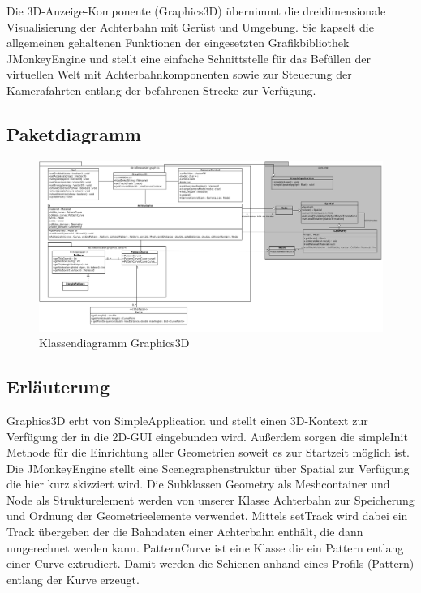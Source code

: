 Die 3D-Anzeige-Komponente (Graphics3D) übernimmt die dreidimensionale Visualisierung der Achterbahn
mit Gerüst und Umgebung. Sie kapselt die allgemeinen gehaltenen Funktionen der eingesetzten
Grafikbibliothek JMonkeyEngine und stellt eine einfache Schnittstelle für das Befüllen 
der virtuellen Welt mit Achterbahnkomponenten sowie zur Steuerung der Kamerafahrten 
entlang der befahrenen Strecke zur Verfügung.

\subsection{Paketdiagramm}

\begin{figure}
\includegraphics[width=\linewidth]{bilder/klassendiagramm_006}
\caption{Klassendiagramm Graphics3D}
\end{figure}

\subsection{Erläuterung}

Graphics3D erbt von SimpleApplication und stellt einen 3D-Kontext zur Verfügung der in die 2D-GUI eingebunden wird. Außerdem sorgen die simpleInit Methode für die Einrichtung aller Geometrien soweit es zur Startzeit möglich ist.
Die JMonkeyEngine stellt eine Scenegraphenstruktur über Spatial zur Verfügung die hier kurz skizziert wird. Die Subklassen Geometry als Meshcontainer und Node als Strukturelement werden von unserer Klasse Achterbahn 
zur Speicherung und Ordnung der Geometrieelemente verwendet. Mittels setTrack wird dabei ein Track übergeben der die Bahndaten einer Achterbahn enthält, die dann umgerechnet werden kann. PatternCurve ist eine Klasse die ein Pattern entlang einer Curve extrudiert. 
Damit werden die Schienen anhand eines Profils (Pattern) entlang der Kurve erzeugt. 

